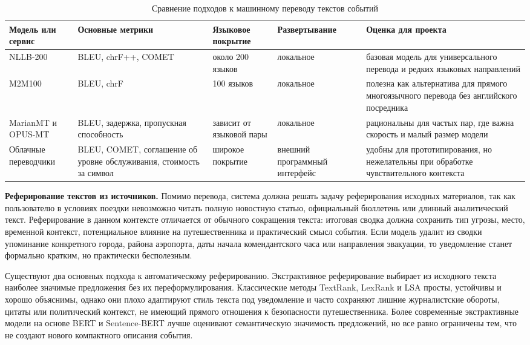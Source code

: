 \begin{table}[h!]
\centering
\small
\caption{Сравнение подходов к машинному переводу текстов событий}
\label{tab:translation_models}
\begin{tabularx}{\textwidth}{|L{2.6cm}|Y|Y|Y|Y|}
\hline
\textbf{Модель или сервис} & \textbf{Основные метрики} & \textbf{Языковое покрытие} & \textbf{Развертывание} & \textbf{Оценка для проекта} \\ \hline
NLLB-200 & BLEU, chrF++, COMET & около 200 языков & локальное & базовая модель для универсального перевода и редких языковых направлений \\ \hline
M2M100 & BLEU, chrF & 100 языков & локальное & полезна как альтернатива для прямого многоязычного перевода без английского посредника \\ \hline
MarianMT и OPUS-MT & BLEU, задержка, пропускная способность & зависит от языковой пары & локальное & рациональны для частых пар, где важна скорость и малый размер модели \\ \hline
Облачные переводчики & BLEU, COMET, соглашение об уровне обслуживания, стоимость за символ & широкое покрытие & внешний про\-граммный интерфейс & удобны для прототипирования, но нежелательны при обработке чувствительного контекста \\ \hline
\end{tabularx}
\end{table}

\textbf{Реферирование текстов из источников.} Помимо перевода, система должна решать задачу реферирования исходных материалов, так как пользователю в условиях поездки невозможно читать полную новостную статью, официальный бюллетень или длинный аналитический текст. Реферирование в данном контексте отличается от обычного сокращения текста: итоговая сводка должна сохранить тип угрозы, место, временной контекст, потенциальное влияние на путешественника и практический смысл события. Если модель удалит из сводки упоминание конкретного города, района аэропорта, даты начала комендантского часа или направления эвакуации, то уведомление станет формально кратким, но практически бесполезным.

Существуют два основных подхода к автоматическому реферированию. Экстрактивное реферирование выбирает из исходного текста наиболее значимые предложения без их переформулирования. Классические методы TextRank, LexRank и LSA просты, устойчивы и хорошо объяснимы, однако они плохо адаптируют стиль текста под уведомление и часто сохраняют лишние журналистские обороты, цитаты или политический контекст, не имеющий прямого отношения к безопасности путешественника\cite{textrank_bib,lexrank_bib,lsa_summarization_bib}. Более современные экстрактивные модели на основе BERT и Sentence-BERT лучше оценивают семантическую значимость предложений, но все равно ограничены тем, что не создают нового компактного описания события.

